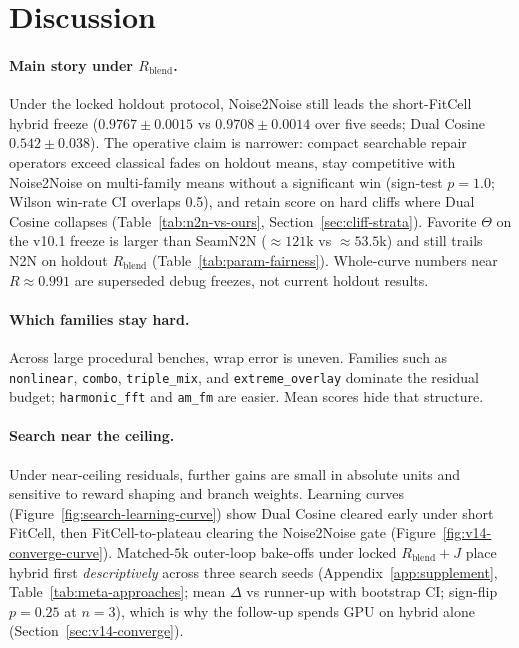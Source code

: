 \section{Discussion}
\label{sec:discussion}

\paragraph{Main story under $R_{\mathrm{blend}}$.}
Under the locked holdout protocol, Noise2Noise still leads the short-FitCell hybrid freeze
($0.9767{\pm}0.0015$ vs $0.9708{\pm}0.0014$ over five seeds; Dual Cosine $0.542{\pm}0.038$).
The operative claim is narrower: compact searchable repair operators exceed classical fades on holdout means, stay competitive with Noise2Noise on multi-family means without a significant win (sign-test $p{=}1.0$; Wilson win-rate CI overlaps 0.5), and retain score on hard cliffs where Dual Cosine collapses
(Table~\ref{tab:n2n-vs-ours}, Section~\ref{sec:cliff-strata}).
Favorite $\Theta$ on the v10.1 freeze is larger than SeamN2N (${\approx}121$k vs ${\approx}53.5$k) and still trails N2N on holdout $R_{\mathrm{blend}}$
(Table~\ref{tab:param-fairness}).
Whole-curve numbers near $R{\approx}0.991$ are superseded debug freezes, not current holdout results.

\paragraph{Which families stay hard.}
Across large procedural benches, wrap error is uneven.
Families such as \texttt{nonlinear}, \texttt{combo}, \texttt{triple\_mix}, and \texttt{extreme\_overlay} dominate the residual budget;
\texttt{harmonic\_fft} and \texttt{am\_fm} are easier.
Mean scores hide that structure.

\paragraph{Search near the ceiling.}
Under near-ceiling residuals, further gains are small in absolute units and sensitive to reward shaping and branch weights.
Learning curves (Figure~\ref{fig:search-learning-curve}) show Dual Cosine cleared early under short FitCell,
then FitCell-to-plateau clearing the Noise2Noise gate (Figure~\ref{fig:v14-converge-curve}).
Matched-$5$k outer-loop bake-offs under locked $R_{\mathrm{blend}}{+}J$ place hybrid first \emph{descriptively} across three search seeds
(Appendix~\ref{app:supplement}, Table~\ref{tab:meta-approaches}; mean $\Delta$ vs runner-up with bootstrap CI; sign-flip $p{=}0.25$ at $n{=}3$), which is why the follow-up spends GPU on hybrid alone
(Section~\ref{sec:v14-converge}).

